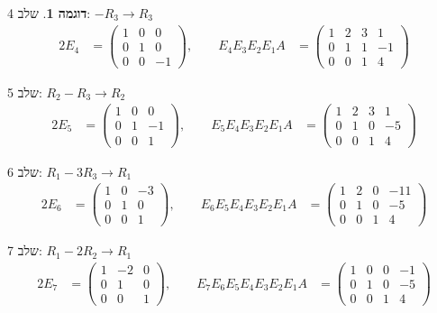 \documentclass[12pt]{report}
\theoremstyle{plain}
\theoremstyle{definition}
\newtheorem{example}{דוגמה}[chapter]
\newcommand{\0}{\mathbf{0}}
\begin{document}
\begin{example}
שלב 4: $-R_3 \to R_3$ 
\begin{alignat*}{2}
E_4 &=
\begin{pmatrix}
1 & 0 & 0 \\
0 & 1 & 0 \\
0 & 0 & -1
\end{pmatrix},
\qquad
E_4 E_3 E_2 E_1 A &=
\begin{pmatrix}
1 & 2 & 3 & 1 \\
0 & 1 & 1 & -1 \\
0 & 0 & 1 & 4
\end{pmatrix}
\end{alignat*}

שלב 5: $R_2 - R_3 \to R_2$
\begin{alignat*}{2}
E_5 &=
\begin{pmatrix}
1 & 0 & 0 \\
0 & 1 & -1 \\
0 & 0 & 1
\end{pmatrix},
\qquad
E_5 E_4 E_3 E_2 E_1 A &=
\begin{pmatrix}
1 & 2 & 3 & 1 \\
0 & 1 & 0 & -5 \\
0 & 0 & 1 & 4
\end{pmatrix}
\end{alignat*}

שלב 6: $R_1 - 3R_3 \to R_1$
\begin{alignat*}{2}
E_6 &=
\begin{pmatrix}
1 & 0 & -3 \\
0 & 1 & 0 \\
0 & 0 & 1
\end{pmatrix},
\qquad
E_6 E_5 E_4 E_3 E_2 E_1 A &=
\begin{pmatrix}
1 & 2 & 0 & -11 \\
0 & 1 & 0 & -5 \\
0 & 0 & 1 & 4
\end{pmatrix}
\end{alignat*}

שלב 7: $R_1 - 2R_2 \to R_1$
\begin{alignat*}{2}
E_7 &=
\begin{pmatrix}
1 & -2 & 0 \\
0 &  1 & 0 \\
0 &  0 & 1
\end{pmatrix},
\qquad
E_7 E_6 E_5 E_4 E_3 E_2 E_1 A &=
\begin{pmatrix}
1 & 0 & 0 & -1 \\
0 & 1 & 0 & -5 \\
0 & 0 & 1 & 4
\end{pmatrix}
\end{alignat*}


\end{example}
\end{document}
